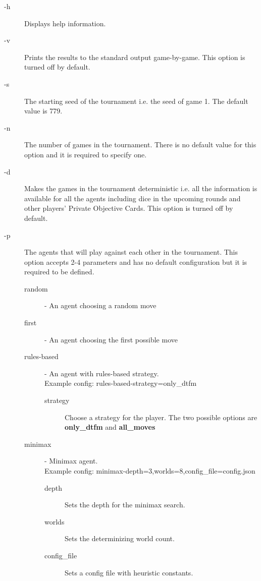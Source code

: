 \begin{description}
    \item[-h] Displays help information. \\
    \item[-v] Prints the results to the standard output game-by-game. This option is turned off by default.\\
    \item[-s] The starting seed of the tournament i.e. the seed of game 1. The default value is 779. \\
    \item[-n] The number of games in the tournament. There is no default value for this option and it is required to specify one.\\
    \item[-d] Makes the games in the tournament deterministic i.e. all the information is available for all the agents including dice in the upcoming rounds and other players' Private Objective Cards. This option is turned off by default.\\
    \item[-p] The agents that will play against each other in the tournament. This option accepts 2-4 parameters and has no default configuration but it is required to be defined.
    \begin{description}
        \item[random] - An agent choosing a random move
        \item[first] - An agent choosing the first possible move
        \item[rules-based] - An agent with rules-based strategy. \\Example config: rules-based-strategy=only\_dtfm
          \begin{description}
            \item[strategy] Choose a strategy for the player. The two possible options are \textbf{only\_dtfm} and \textbf{all\_moves}
          \end{description}
        \item[minimax] - Minimax agent. \\ Example config: minimax-depth=3,worlds=8,config\_file=config.json
          \begin{description}
            \item[depth] Sets the depth for the minimax search.
            \item[worlds] Sets the determinizing world count.
            \item[config\_file] Sets a config file with heuristic constants.

\end{description}
\end{description}
\end{description}
